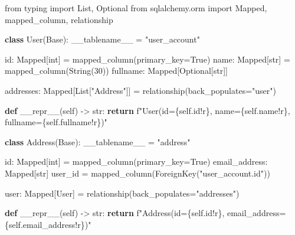 \documentclass[
  letterpaper,
  DIV=11,
  numbers=noendperiod]{scrreprt}
\newenvironment{Shaded}{\begin{snugshade}}{\end{snugshade}}
\newcommand{\BuiltInTok}[1]{\textcolor[rgb]{0.00,0.23,0.31}{#1}}
\newcommand{\ControlFlowTok}[1]{\textcolor[rgb]{0.00,0.23,0.31}{\textbf{#1}}}
\newcommand{\DecValTok}[1]{\textcolor[rgb]{0.68,0.00,0.00}{#1}}
\newcommand{\FunctionTok}[1]{\textcolor[rgb]{0.28,0.35,0.67}{#1}}
\newcommand{\ImportTok}[1]{\textcolor[rgb]{0.00,0.46,0.62}{#1}}
\newcommand{\KeywordTok}[1]{\textcolor[rgb]{0.00,0.23,0.31}{\textbf{#1}}}
\newcommand{\NormalTok}[1]{\textcolor[rgb]{0.00,0.23,0.31}{#1}}
\newcommand{\OperatorTok}[1]{\textcolor[rgb]{0.37,0.37,0.37}{#1}}
\newcommand{\SpecialCharTok}[1]{\textcolor[rgb]{0.37,0.37,0.37}{#1}}
\newcommand{\SpecialStringTok}[1]{\textcolor[rgb]{0.13,0.47,0.30}{#1}}
\newcommand{\StringTok}[1]{\textcolor[rgb]{0.13,0.47,0.30}{#1}}
\newcommand{\VariableTok}[1]{\textcolor[rgb]{0.07,0.07,0.07}{#1}}
\begin{document}
\begin{Shaded}
\begin{Highlighting}[]
\ImportTok{from}\NormalTok{ typing }\ImportTok{import}\NormalTok{ List, Optional}
\ImportTok{from}\NormalTok{ sqlalchemy.orm }\ImportTok{import}\NormalTok{ Mapped, mapped\_column, relationship}

\KeywordTok{class}\NormalTok{ User(Base):}
\NormalTok{    \_\_tablename\_\_ }\OperatorTok{=} \StringTok{"user\_account"}

    \BuiltInTok{id}\NormalTok{: Mapped[}\BuiltInTok{int}\NormalTok{] }\OperatorTok{=}\NormalTok{ mapped\_column(primary\_key}\OperatorTok{=}\VariableTok{True}\NormalTok{)}
\NormalTok{    name: Mapped[}\BuiltInTok{str}\NormalTok{] }\OperatorTok{=}\NormalTok{ mapped\_column(String(}\DecValTok{30}\NormalTok{))}
\NormalTok{    fullname: Mapped[Optional[}\BuiltInTok{str}\NormalTok{]]}

\NormalTok{    addresses: Mapped[List[}\StringTok{"Address"}\NormalTok{]] }\OperatorTok{=}\NormalTok{ relationship(back\_populates}\OperatorTok{=}\StringTok{"user"}\NormalTok{)}

    \KeywordTok{def} \FunctionTok{\_\_repr\_\_}\NormalTok{(}\VariableTok{self}\NormalTok{) }\OperatorTok{{-}\textgreater{}} \BuiltInTok{str}\NormalTok{:}
        \ControlFlowTok{return} \SpecialStringTok{f"User(id=}\SpecialCharTok{\{}\VariableTok{self}\SpecialCharTok{.}\BuiltInTok{id}\SpecialCharTok{!r\}}\SpecialStringTok{, name=}\SpecialCharTok{\{}\VariableTok{self}\SpecialCharTok{.}\NormalTok{name}\SpecialCharTok{!r\}}\SpecialStringTok{, fullname=}\SpecialCharTok{\{}\VariableTok{self}\SpecialCharTok{.}\NormalTok{fullname}\SpecialCharTok{!r\}}\SpecialStringTok{)"}

\KeywordTok{class}\NormalTok{ Address(Base):}
\NormalTok{    \_\_tablename\_\_ }\OperatorTok{=} \StringTok{"address"}

    \BuiltInTok{id}\NormalTok{: Mapped[}\BuiltInTok{int}\NormalTok{] }\OperatorTok{=}\NormalTok{ mapped\_column(primary\_key}\OperatorTok{=}\VariableTok{True}\NormalTok{)}
\NormalTok{    email\_address: Mapped[}\BuiltInTok{str}\NormalTok{]}
\NormalTok{    user\_id }\OperatorTok{=}\NormalTok{ mapped\_column(ForeignKey(}\StringTok{"user\_account.id"}\NormalTok{))}

\NormalTok{    user: Mapped[User] }\OperatorTok{=}\NormalTok{ relationship(back\_populates}\OperatorTok{=}\StringTok{"addresses"}\NormalTok{)}

    \KeywordTok{def} \FunctionTok{\_\_repr\_\_}\NormalTok{(}\VariableTok{self}\NormalTok{) }\OperatorTok{{-}\textgreater{}} \BuiltInTok{str}\NormalTok{:}
        \ControlFlowTok{return} \SpecialStringTok{f"Address(id=}\SpecialCharTok{\{}\VariableTok{self}\SpecialCharTok{.}\BuiltInTok{id}\SpecialCharTok{!r\}}\SpecialStringTok{, email\_address=}\SpecialCharTok{\{}\VariableTok{self}\SpecialCharTok{.}\NormalTok{email\_address}\SpecialCharTok{!r\}}\SpecialStringTok{)"}
\end{Highlighting}
\end{Shaded}
\end{document}
